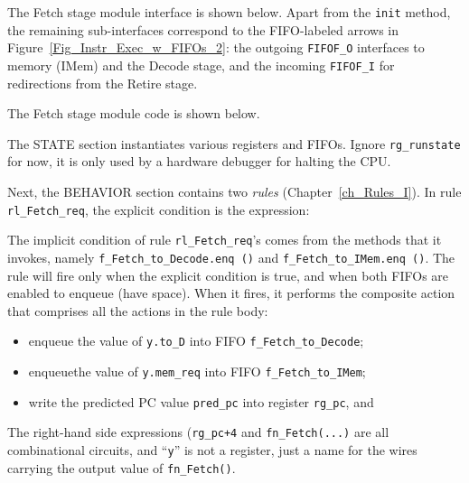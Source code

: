 \label{Sec_Fife_Fetch_stage}

The Fetch stage module interface is shown below.  Apart from the
\verb|init| method, the remaining sub-interfaces correspond to the
FIFO-labeled arrows in Figure~\ref{Fig_Instr_Exec_w_FIFOs_2}: the
outgoing \verb|FIFOF_O| interfaces to memory (IMem) and the Decode
stage, and the incoming \verb|FIFOF_I| for redirections from the
Retire stage.


The Fetch stage module code is shown below.


The STATE section instantiates various registers and FIFOs.  Ignore
\verb|rg_runstate| for now, it is only used by a hardware debugger for
halting the CPU.

Next, the BEHAVIOR section contains two \emph{rules}
(Chapter~\ref{ch_Rules_I}).  In rule \verb|rl_Fetch_req|, the explicit
condition is the expression:


The implicit condition of rule \verb|rl_Fetch_req|'s comes from the
methods that it invokes, namely \verb|f_Fetch_to_Decode.enq ()| and
\verb|f_Fetch_to_IMem.enq ()|.  The rule will fire only when the
explicit condition is true, and when both FIFOs are enabled to enqueue
(have space).  When it fires, it performs the composite action that
comprises all the actions in the rule body:


\begin{itemize}

 \item enqueue the value of \verb|y.to_D| into FIFO \verb|f_Fetch_to_Decode|;

 \item enqueuethe value of \verb|y.mem_req| into FIFO \verb|f_Fetch_to_IMem|;

 \item write the predicted PC value \verb|pred_pc| into register \verb|rg_pc|, and

\end{itemize}

The right-hand side expressions (\verb|rg_pc+4| and
\verb|fn_Fetch(...)| are all combinational circuits, and ``\verb|y|''
is not a register, just a name for the wires carrying the output value
of \verb|fn_Fetch()|.


